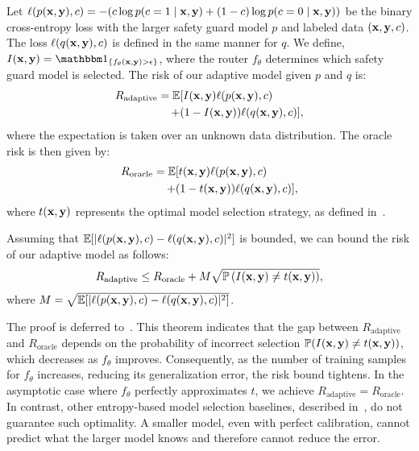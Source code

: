 Let $\ell(p({\mathbf{x}},{\mathbf{y}}), c)= -(c \log p(c=1\mid {\mathbf{x}},{\mathbf{y}}) +(1-c)\log p(c=0\mid {\mathbf{x}},{\mathbf{y}}))$ be the binary cross-entropy loss with the larger safety guard model $p$ and labeled data $({\mathbf{x}},{\mathbf{y}},c)$. The loss $\ell(q({\mathbf{x}},{\mathbf{y}}),c)$ is defined in the same manner for $q$. We define, $I(\rvx,\rvy) = \one_{\{ f_\theta(\rvx,\rvy) >\epsilon \}}$, where  the router $f_\theta$ determines which safety guard model is selected. The risk of our adaptive model given $p$ and $q$ is: 
\begin{align*}
\begin{split}
    R_\text{adaptive} = \mathbb{E}&[I({\mathbf{x}},{\mathbf{y}})\ell(p({\mathbf{x}},{\mathbf{y}}), c)  \\+
    &(1-I({\mathbf{x}},{\mathbf{y}}))\ell(q({\mathbf{x}},{\mathbf{y}}), c) ],
\end{split}
\end{align*}
where the expectation is taken over an unknown data distribution.  The oracle risk is then given by:
\begin{align*}
    \begin{split}
        R_\text{oracle} = \mathbb{E}&[t({\mathbf{x}},{\mathbf{y}})\ell(p({\mathbf{x}},{\mathbf{y}}),c) 
        \\+ &(1-t({\mathbf{x}},{\mathbf{y}})) \ell(q({\mathbf{x}},{\mathbf{y}}),c)],
    \end{split}
\end{align*}
where $t({\mathbf{x}},{\mathbf{y}})$ represents the optimal model selection strategy, as defined in~. 
\begin{thm}
Assuming that $\mathbb{E}[\lvert \ell(p({\mathbf{x}},{\mathbf{y}}),c)-\ell(q({\mathbf{x}},{\mathbf{y}}),c)\rvert^2]$ is bounded, we can bound the risk of our adaptive model as follows:
\begin{equation*}
\begin{gathered}
    R_\text{adaptive} \leq R_\text{oracle} + M\sqrt{\mathbb{P}\left(I({\mathbf{x}},{\mathbf{y}})\neq t({\mathbf{x}},{\mathbf{y}})\right)},
\end{gathered}
\end{equation*}
where $M=\sqrt{\mathbb{E}[\lvert \ell(p({\mathbf{x}},{\mathbf{y}}),c)-\ell(q({\mathbf{x}},{\mathbf{y}}),c)\rvert^2]}$.
\label{thm}
\end{thm}
The proof is deferred to~.
This theorem indicates that the gap between $R_{\text{adaptive}}$ and $R_{\text{oracle}}$ depends on the probability of incorrect selection $\mathbb{P}(I({\mathbf{x}},{\mathbf{y}})\neq t({\mathbf{x}},{\mathbf{y}}))$, which decreases as $f_\theta$ improves. Consequently, as the number of training samples for $f_\theta$ increases, reducing its generalization error, the risk bound tightens. In the asymptotic case where $f_\theta$ perfectly approximates $t$, we achieve $R_{\text{adaptive}} = R_{\text{oracle}}$. In contrast, other entropy-based model selection baselines, described in~, do not guarantee such optimality. 
A smaller model, even with perfect calibration, cannot predict what the larger model knows and therefore cannot reduce the error. 
